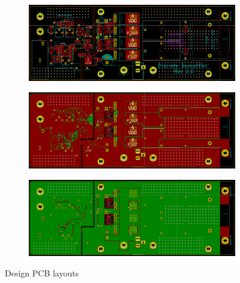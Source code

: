 \documentclass[a4paper,11pt]{article}
\begin{document}
\begin{figure}[h!]
    \centering
    \begin{subfigure}{0.8\textwidth}
        \includegraphics[width=\columnwidth]{pcb/traces.png}
    \end{subfigure}
    \begin{subfigure}{0.8\textwidth}
        \includegraphics[width=\columnwidth]{pcb/top_layer.png}
    \end{subfigure}
    \begin{subfigure}{0.8\textwidth}
        \includegraphics[width=\columnwidth]{pcb/bottom_layer.png}
    \end{subfigure}
    \caption{Design PCB layouts}
\end{figure}
\end{document}
